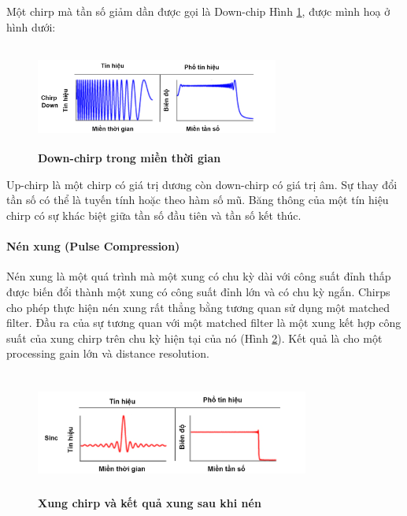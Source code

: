 \documentclass{article} %
\begin{document}
	Một chirp mà tần số giảm dần được gọi là Down-chip Hình \ref{Down_chirp}, được mình hoạ ở hình dưới:
	
	\begin{figure}[!ht]
		\centering
		\includegraphics[width=8cm,height=3.4cm]{Images/Down_Chirp.png}
		\caption[Down-chirp trong miền thời gian \cite{zhang2019spread}]{\bfseries \fontsize{12pt}{0pt}\selectfont Down-chirp trong miền thời gian \cite{zhang2019spread}}
		\label{Down_chirp}
	\end{figure}
	\newpage
	Up-chirp là một chirp có giá trị dương còn down-chirp có giá trị âm. Sự thay đổi tần số có thể là tuyến tính hoặc theo hàm số mũ. Băng thông của một tín hiệu chirp có sự khác biệt giữa tần số đầu tiên và tần số kết thúc.
	
	\paragraph{Nén xung (Pulse Compression)}\mbox{}
	
	Nén xung là một quá trình mà một xung có chu kỳ dài với công suất đỉnh thấp được biến đổi thành một xung có công suất đỉnh lớn và có chu kỳ ngắn. Chirps cho phép thực hiện nén xung rất thẳng bằng tương quan sử dụng một matched filter. Đầu ra của sự tương quan với một matched filter là một xung kết hợp công suất của xung chirp trên chu kỳ hiện tại của nó (Hình \ref{xungchirp}). Kết quả là cho một processing gain lớn và distance resolution.
	
	\begin{figure}[!ht]
		\centering
		\includegraphics[width=9cm,height=4cm]{Images/xungchirp.png}
		\caption[Xung chirp và kết quả xung sau khi nén \cite{zhang2019spread}]{\bfseries \fontsize{12pt}{0pt}\selectfont Xung chirp và kết quả xung sau khi nén \cite{zhang2019spread}}
		\label{xungchirp}
	\end{figure}
	
\end{document}
